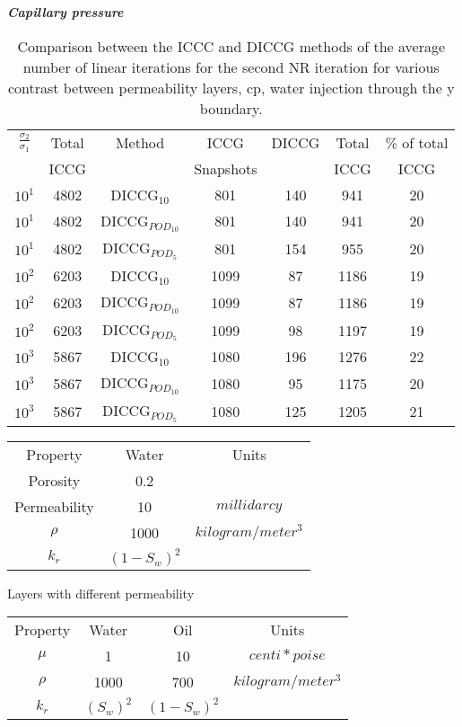 \documentclass[a4paper,10pt]{report}
\begin{document}
\emph{\textbf{Capillary pressure}}
\begin{table}[!ht]\centering
\begin{minipage}{1\textwidth}
 \centering
\begin{tabular}{ ||c|c||c|c|c|c|c||} 
\hline
$\frac{\sigma_2}{\sigma_1}$&Total&Method  & ICCG&DICCG &Total&\% of total\\ 
                           & ICCG     &  & Snapshots& &ICCG& ICCG\\ 
\hline 
$10^{1}$ &4802& DICCG$_{10}$&801&140&941&20\\ 
\hline  
$10^{1}$ &4802& DICCG$_{POD_{10}}$&801&140&941&20 \\ 
\hline  
$10^{1}$ &4802& DICCG$_{POD_{5}}$&801&154&955&20 \\ 
\hline  
$10^{2}$ &6203& DICCG$_{10}$&1099&87&1186&19\\ 
\hline  
$10^{2}$ &6203& DICCG$_{POD_{10}}$&1099&87&1186&19 \\ 
\hline  
$10^{2}$ &6203& DICCG$_{POD_{5}}$&1099&98&1197&19 \\ 
\hline  
$10^{3}$ &5867& DICCG$_{10}$&1080&196&1276&22\\ 
\hline  
$10^{3}$ &5867& DICCG$_{POD_{10}}$&1080&95&1175&20 \\ 
\hline  
$10^{3}$ &5867& DICCG$_{POD_{5}}$&1080&125&1205&21 \\ 
\hline  
\end{tabular} 
\caption{Comparison between the ICCC and DICCG methods of the average number of linear iterations for the second NR iteration for various contrast between permeability layers, cp, water injection through the y boundary. }\label{table:litertot2} 
\end{minipage}  
\end{table}  




\begin{table}[!ht]
\centering
\begin{tabular}{ |c|c|c|} 
\hline
Property&Water&Units\\
Porosity&     0.2&    \\ 
Permeability&     10&    $milli darcy$  \\  
$\rho$& 1000& $kilogram/meter^3$\\
$k_r$& $(1-S_w)^2$ &  \\
 \hline
\end{tabular}
\label{table:rock}
\end{table} 

Layers with different permeability
\begin{table}[!ht]
\centering
\begin{tabular}{ |c|c|c|c|} 
\hline
Property&Water&Oil&Units\\
$\mu$&     1&    10 & $centi*poise$  \\  
$\rho$& 1000& 700& $kilogram/meter^3$\\
$k_r$&$(S_w)^2$&   $(1-S_w)^2$ &  \\
 \hline
\end{tabular}
\label{table:fluid}
\end{table} 
\end{document}
